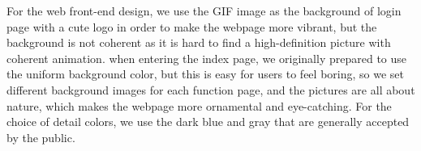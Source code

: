 \noindent For the web front-end design, we use the GIF image as the background of login page with a cute logo in order to make the webpage more vibrant, but the background is not coherent as it is hard to find a high-definition picture with coherent animation. when entering the index page, we originally prepared to use the uniform background color, but this is easy for users to feel boring, so we set different background images for each function page, and the pictures are all about nature, which makes the webpage more ornamental and eye-catching. For the choice of detail colors, we use the dark blue and gray that are generally accepted by the public.






